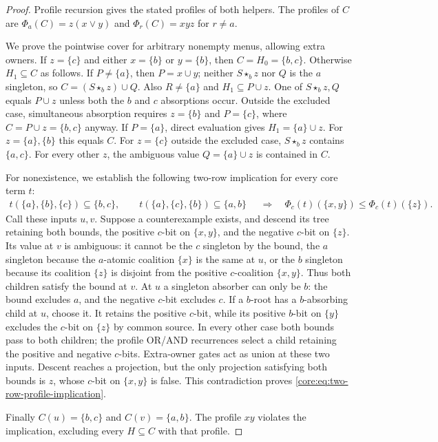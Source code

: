 \begin{proof}
Profile recursion gives the stated profiles of both helpers. The profiles
of $C$ are $\Phi_a(C)=z(x\lor y)$ and $\Phi_r(C)=xyz$ for $r\ne a$.

We prove the pointwise cover for arbitrary nonempty menus, allowing extra
owners. If $z=\{c\}$ and either $x=\{b\}$ or $y=\{b\}$, then
$C=H_0=\{b,c\}$. Otherwise $H_1\subseteq C$ as follows.
If $P\ne\{a\}$, then $P=x\cup y$; neither $S\star_b z$ nor $Q$ is the
$a$ singleton, so $C=(S\star_b z)\cup Q$. Also $R\ne\{a\}$ and
$H_1\subseteq P\cup z$. One of $S\star_b z,Q$ equals $P\cup z$ unless
both the $b$ and $c$ absorptions occur. Outside the excluded case, simultaneous
absorption requires $z=\{b\}$ and $P=\{c\}$, where
$C=P\cup z=\{b,c\}$ anyway. If $P=\{a\}$, direct evaluation gives
$H_1=\{a\}\cup z$. For $z=\{a\},\{b\}$ this equals $C$.
For $z=\{c\}$ outside the excluded case, $S\star_b z$ contains
$\{a,c\}$. For every other $z$, the ambiguous value
$Q=\{a\}\cup z$ is contained in $C$.

For nonexistence, we establish the following two-row implication for every
core term $t$:
\begin{equation}\label{core:eq:two-row-profile-implication}
 \begin{gathered}
 t(\{a\},\{b\},\{c\})\subseteq\{b,c\},\qquad
 t(\{a\},\{c\},\{b\})\subseteq\{a,b\}
 \end{gathered}
 \quad\Longrightarrow\quad
 \Phi_c(t)(\{x,y\})\leq\Phi_c(t)(\{z\}).
\end{equation}
Call these inputs $u,v$. Suppose a counterexample exists, and descend its
tree retaining both bounds, the positive $c$-bit on $\{x,y\}$, and the
negative $c$-bit on $\{z\}$. Its value at $v$ is ambiguous: it cannot
be the $c$ singleton by the bound, the $a$ singleton because the
$a$-atomic coalition $\{x\}$ is the same at $u$, or the $b$ singleton
because its coalition $\{z\}$ is disjoint from the positive $c$-coalition
$\{x,y\}$. Thus both children satisfy the bound at $v$.
At $u$ a singleton absorber can only be $b$: the bound excludes $a$,
and the negative $c$-bit excludes $c$. If a $b$-root has a $b$-absorbing
child at $u$, choose it. It retains the positive $c$-bit, while its
positive $b$-bit on $\{y\}$ excludes the $c$-bit on $\{z\}$ by common
source. In every other case both bounds pass to both children; the
profile OR/AND recurrences select a child retaining the positive and
negative $c$-bits. Extra-owner gates act as union at these two inputs.
Descent reaches a projection, but the only projection satisfying both
bounds is $z$, whose $c$-bit on $\{x,y\}$ is false. This contradiction
proves \eqref{core:eq:two-row-profile-implication}.

Finally $C(u)=\{b,c\}$ and $C(v)=\{a,b\}$. The profile $xy$ violates
the implication, excluding every $H\subseteq C$ with that profile.
\end{proof}
